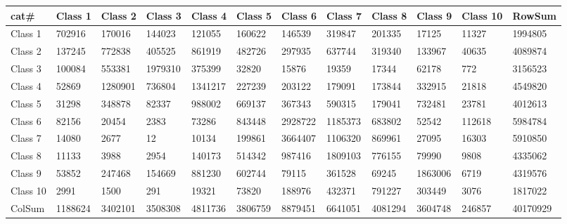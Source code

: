 \begin{table}[!ht]
    \centering
    \begin{tabular}{|l|l|l|l|l|l|l|l|l|l|l|l|}
    \hline
        \textbf{cat\#} & \textbf{Class 1} & \textbf{Class 2} & \textbf{Class 3} & \textbf{Class 4} & \textbf{Class 5} & \textbf{Class 6} & \textbf{Class 7} & \textbf{Class 8} & \textbf{Class 9} & \textbf{Class 10} & \textbf{RowSum} \\ \hline
        Class 1 & 702916 & 170016 & 144023 & 121055 & 160622 & 146539 & 319847 & 201335 & 17125 & 11327 & 1994805 \\ \hline
        Class 2 & 137245 & 772838 & 405525 & 861919 & 482726 & 297935 & 637744 & 319340 & 133967 & 40635 & 4089874 \\ \hline
        Class 3 & 100084 & 553381 & 1979310 & 375399 & 32820 & 15876 & 19359 & 17344 & 62178 & 772 & 3156523 \\ \hline
        Class 4 & 52869 & 1280901 & 736804 & 1341217 & 227239 & 203122 & 179091 & 173844 & 332915 & 21818 & 4549820 \\ \hline
        Class 5 & 31298 & 348878 & 82337 & 988002 & 669137 & 367343 & 590315 & 179041 & 732481 & 23781 & 4012613 \\ \hline
        Class 6 & 82156 & 20454 & 2383 & 73286 & 843448 & 2928722 & 1185373 & 683802 & 52542 & 112618 & 5984784 \\ \hline
        Class 7 & 14080 & 2677 & 12 & 10134 & 199861 & 3664407 & 1106320 & 869961 & 27095 & 16303 & 5910850 \\ \hline
        Class 8 & 11133 & 3988 & 2954 & 140173 & 514342 & 987416 & 1809103 & 776155 & 79990 & 9808 & 4335062 \\ \hline
        Class 9 & 53852 & 247468 & 154669 & 881230 & 602744 & 79115 & 361528 & 69245 & 1863006 & 6719 & 4319576 \\ \hline
        Class 10 & 2991 & 1500 & 291 & 19321 & 73820 & 188976 & 432371 & 791227 & 303449 & 3076 & 1817022 \\ \hline
        ColSum & 1188624 & 3402101 & 3508308 & 4811736 & 3806759 & 8879451 & 6641051 & 4081294 & 3604748 & 246857 & 40170929 \\ \hline
    \end{tabular}
\end{table}